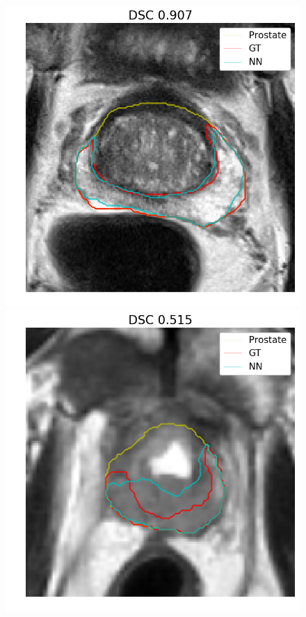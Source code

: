 \begin{figure}[h]
    \includegraphics[totalheight=.2\textheight]{imgs/results/PZ_Px_Challenge__P_yes_ROI_MAX_Case-0028.png}
    \vspace{10mm}
    \includegraphics[totalheight=.2\textheight]{imgs/results/PZ_GE__GE_yes_ROI_MIN_Case-0383.png}

\end{figure}
